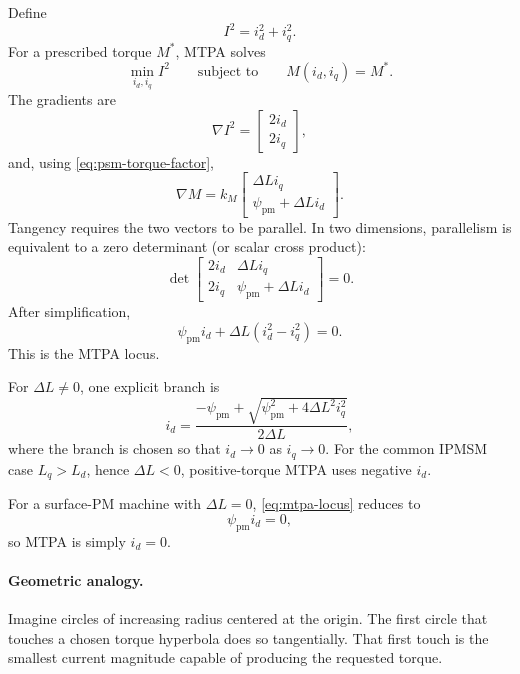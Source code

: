 \documentclass[11pt,a4paper]{article}
\newcommand{\id}{i_d}
\newcommand{\iq}{i_q}
\newcommand{\Ld}{L_d}
\newcommand{\Lq}{L_q}
\newcommand{\psipm}{\psi_{\mathrm{pm}}}
\begin{document}
Define
\begin{equation}
  I^2=\id^2+\iq^2.
\end{equation}
For a prescribed torque $M^*$, MTPA solves
\begin{equation}
  \min_{\id,\iq} I^2
  \qquad\text{subject to}\qquad
  M(\id,\iq)=M^*.
  \label{eq:mtpa-problem}
\end{equation}
The gradients are
\begin{equation}
  \nabla I^2=
  \begin{bmatrix}2\id\\2\iq\end{bmatrix},
\end{equation}
and, using \eqref{eq:psm-torque-factor},
\begin{equation}
  \nabla M
  =k_M
  \begin{bmatrix}
  \Delta L\iq\\
  \psipm+\Delta L\id
  \end{bmatrix}.
\end{equation}
Tangency requires the two vectors to be parallel. In two dimensions, parallelism is equivalent to a zero determinant (or scalar cross product):
\begin{equation}
  \det
  \begin{bmatrix}
  2\id & \Delta L\iq\\
  2\iq & \psipm+\Delta L\id
  \end{bmatrix}=0.
\end{equation}
After simplification,
\begin{equation}
  \boxed{
  \psipm\id+\Delta L(\id^2-\iq^2)=0.
  }
  \label{eq:mtpa-locus}
\end{equation}
This is the MTPA locus.

For $\Delta L\neq0$, one explicit branch is
\begin{equation}
  \id=\frac{-\psipm+\sqrt{\psipm^2+4\Delta L^2\iq^2}}{2\Delta L},
  \label{eq:mtpa-explicit}
\end{equation}
where the branch is chosen so that $\id\to0$ as $\iq\to0$. For the common IPMSM case $\Lq>\Ld$, hence $\Delta L<0$, positive-torque MTPA uses negative $i_d$.

For a surface-PM machine with $\Delta L=0$, \eqref{eq:mtpa-locus} reduces to
\begin{equation}
  \psipm\id=0,
\end{equation}
so MTPA is simply $\id=0$.

\paragraph{Geometric analogy.}
Imagine circles of increasing radius centered at the origin. The first circle that touches a chosen torque hyperbola does so tangentially. That first touch is the smallest current magnitude capable of producing the requested torque.
\end{document}
